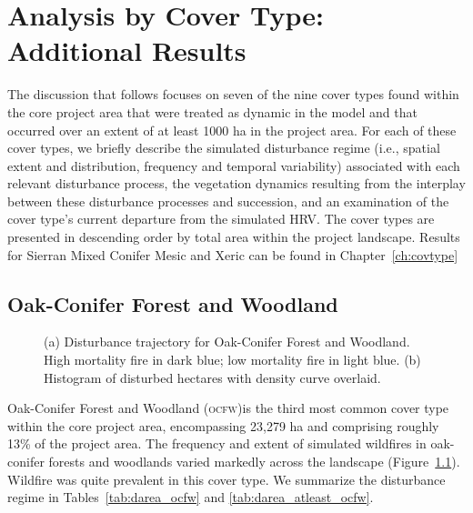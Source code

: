 \chapter{Analysis by Cover Type: Additional Results}
\label{app:covtype_analysis}

The discussion that follows focuses on seven of the nine cover types found within the core project area that were treated as dynamic in the model and that occurred over an extent of at least 1000 ha in the project area. For each of these cover types, we briefly describe the simulated disturbance regime (i.e., spatial extent and distribution, frequency and temporal variability) associated with each relevant disturbance process, the vegetation dynamics resulting from the interplay between these disturbance processes and succession, and an examination of the cover type’s current departure from the simulated HRV. The cover types are presented in descending order by total area within the project landscape. Results for Sierran Mixed Conifer Mesic and Xeric can be found in Chapter~\ref{ch:covtype}


\section{Oak-Conifer Forest and Woodland} 
\begin{figure}[!htbp]
  \centering
  \caption{\small (a) Disturbance trajectory for Oak-Conifer Forest and Woodland. High mortality fire in dark blue; low mortality fire in light blue. (b) Histogram of disturbed hectares with density curve overlaid.} 
  \label{fig:darea_ocfw}
\end{figure}

Oak-Conifer Forest and Woodland (\textsc{ocfw})is the third most common cover type within the core project area, encompassing 23,279 ha and comprising roughly 13\% of the project area. The frequency and extent of simulated wildfires in oak-conifer forests and woodlands varied markedly across the landscape (Figure~\ref{fig:darea_ocfw}). Wildfire was quite prevalent in this cover type. We summarize the disturbance regime in Tables~\ref{tab:darea_ocfw} and \ref{tab:darea_atleast_ocfw}.

